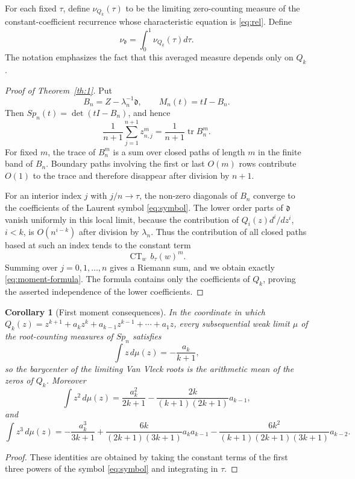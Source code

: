 \documentclass[10pt,twoside,a4paper,reqno]{amsart}
\theoremstyle{plain}
\newtheorem{coro}           {Corollary}
\theoremstyle{definition}
\theoremstyle{remark}
\newenvironment{corollary}{\begin{coro}}{\end{coro}}
\newcommand {\dq}{\mathfrak d}
\newcommand {\CT} {\operatorname {CT}}
\begin{document}
For each fixed $\tau$, define $\nu_{Q_k}(\tau)$ to be the limiting zero-counting measure of the constant-coefficient recurrence whose characteristic equation is \eqref{eq:rel}. Define
\[
\nu_\dq=\int_0^1 \nu_{Q_k}(\tau)d\tau .
\]
The notation emphasizes the fact that this averaged measure depends only on $Q_k$.

\begin{proof}[Proof of Theorem~\ref{th:1}]
Put
\[
        B_n=Z-\lambda_n^{-1}\dq,
        \qquad M_n(t)=tI-B_n .
\]
Then $Sp_n(t)=\det(tI-B_n)$, and hence
\[
        \frac{1}{n+1}\sum_{j=1}^{n+1}z_{n,j}^m
        =\frac{1}{n+1}\operatorname{tr} B_n^m .
\]
For fixed $m$, the trace of $B_n^m$ is a sum over closed paths of length $m$ in the finite band of $B_n$.  Boundary paths involving the first or last $O(m)$ rows contribute $O(1)$ to the trace and therefore disappear after division by $n+1$.

For an interior index $j$ with $j/n\to\tau$, the non-zero diagonals of $B_n$ converge to the coefficients of the Laurent symbol \eqref{eq:symbol}.  The lower order parts of $\dq$ vanish uniformly in this local limit, because the contribution of $Q_i(z)d^i/dz^i$, $i<k$, is $O(n^{i-k})$ after division by $\lambda_n$.  Thus the contribution of all closed paths based at such an index tends to the constant term
\[
        \CT_w\, b_\tau(w)^m .
\]
Summing over $j=0,1,\ldots,n$ gives a Riemann sum, and we obtain exactly \eqref{eq:moment-formula}.  The formula contains only the coefficients of $Q_k$, proving the asserted independence of the lower coefficients.
\end{proof}

\begin{corollary}[First moment consequences]\label{cor:first-moments}
In the coordinate in which
$Q_k(z)=z^{k+1}+a_kz^k+a_{k-1}z^{k-1}+\cdots+a_1z$, every subsequential weak limit $\mu$ of the root-counting measures of $Sp_n$ satisfies
\[
        \int z\,d\mu(z)=-\frac{a_k}{k+1},
\]
so the barycenter of the limiting Van Vleck roots is the arithmetic mean of the zeros of $Q_k$.  Moreover
\[
        \int z^2\,d\mu(z)=
        \frac{a_k^2}{2k+1}
        -\frac{2k}{(k+1)(2k+1)}a_{k-1},
\]
and
\[
        \int z^3\,d\mu(z)=
        -\frac{a_k^3}{3k+1}
        +\frac{6k}{(2k+1)(3k+1)}a_ka_{k-1}
        -\frac{6k^2}{(k+1)(2k+1)(3k+1)}a_{k-2}.
\]
\end{corollary}

\begin{proof}
These identities are obtained by taking the constant terms of the first three powers of the symbol \eqref{eq:symbol} and integrating in $\tau$.
\end{proof}
\end{document}
